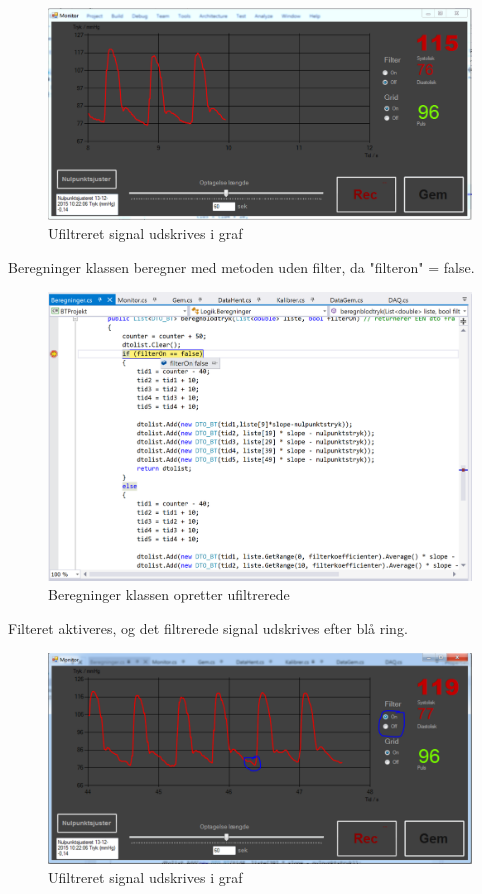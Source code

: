 \begin{figure}[H]
	\centering
	\includegraphics[width=1\textwidth]{Figurer/Test_Aktiver_1}
	\caption{Ufiltreret signal udskrives i graf}
\end{figure}

Beregninger klassen beregner med metoden uden filter, da "filteron" = false.

\begin{figure}[H]
	\centering
	\includegraphics[width=1\textwidth]{Figurer/Test_Aktiver_2}
	\caption{Beregninger klassen opretter ufiltrerede}
\end{figure}

Filteret aktiveres, og det filtrerede signal udskrives efter blå ring.

\begin{figure}[H]
	\centering
	\includegraphics[width=1\textwidth]{Figurer/Test_Aktiver_3}
	\caption{Ufiltreret signal udskrives i graf}
\end{figure}

